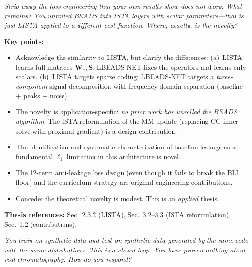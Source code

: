 \documentclass[11pt, letterpaper]{article}
\newcounter{qcounter}
\newcommand{\question}[1]{%
  \stepcounter{qcounter}%
  \begin{questionbox}[Q\theqcounter]%
    \itshape #1%
  \end{questionbox}%
}
\begin{document}
\vspace{0.5em}

\question{Strip away the loss engineering that your own results show does
not work.  What remains?  You unrolled BEADS into ISTA layers with
scalar parameters---that is just LISTA applied to a different cost
function.  Where, exactly, is the novelty?}

\begin{answerbox}
\textbf{Key points:}
\begin{itemize}[nosep]
  \item Acknowledge the similarity to LISTA, but clarify the differences:
        (a)~LISTA learns full matrices $\mathbf{W}_e, \mathbf{S}$;
        LBEADS-NET fixes the operators and learns only scalars.
        (b)~LISTA targets sparse coding; LBEADS-NET targets a
        \emph{three-component} signal decomposition with frequency-domain
        separation (baseline $+$ peaks $+$ noise).
  \item The novelty is application-specific:
        \emph{no prior work has unrolled the BEADS algorithm}.
        The ISTA reformulation of the MM update (replacing CG inner
        solve with proximal gradient) is a design contribution.
  \item The identification and systematic characterisation of
        baseline leakage as a fundamental $\ell_1$ limitation in
        this architecture is novel.
  \item The 12-term anti-leakage loss design (even though it fails
        to break the BLI floor) and the curriculum strategy are
        original engineering contributions.
  \item Concede: the theoretical novelty is modest.  This is an
        \emph{applied} thesis.
\end{itemize}
\textbf{Thesis references:} Sec.~2.3.2 (LISTA), Sec.~3.2--3.3 (ISTA reformulation), Sec.~1.2 (contributions).
\end{answerbox}

\question{You train on synthetic data and test on synthetic data generated
by the \emph{same} code with the \emph{same} distributions.  This is
a closed loop.  You have proven nothing about real chromatography.
How do you respond?}
\end{document}
